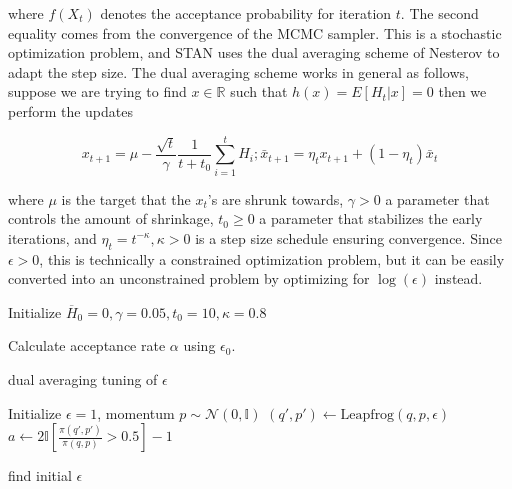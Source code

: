 \documentclass[]{report}
\begin{document}
where $f(X_t)$ denotes the acceptance probability for iteration $t$. The
second equality comes from the convergence of the MCMC sampler. This is a
stochastic optimization problem, and STAN uses the dual averaging scheme of
Nesterov  to adapt the step size. The dual averaging scheme works in general as
follows, suppose we are trying to find $x\in \mathbb{R}$ such that $h(x) =
E[H_t|x] = 0$ then we perform the updates 

\[x_{t+1}  = \mu - \frac{\sqrt{t}}{\gamma} \frac{1}{t+t_0} \sum_{i=1}^tH_i;
\bar{x}_{t+1} = \eta_t x_{t+1} + (1-\eta_t) \bar{x}_t \]

where $\mu$ is the target that the $x_t$'s are shrunk towards, $\gamma > 0$ a
parameter that controls the amount of shrinkage, $t_0 \ge 0$ a parameter that
stabilizes the early iterations, and $\eta_t = t^{-\kappa},\kappa>0$ is a
step size schedule ensuring convergence. Since $\epsilon>0$, this is technically
a constrained optimization problem, but it can be easily converted into an
unconstrained problem by optimizing for $\log(\epsilon)$ instead. 

\begin{algorithm}

Initialize $\overline{H}_0 = 0, \gamma = 0.05, t_0 = 10 ,\kappa = 0.8 $ \;
	
	Calculate acceptance rate $\alpha$ using $\epsilon_0$. \;

\caption{dual averaging tuning of $\epsilon$ }
\end{algorithm}


\begin{algorithm}
Initialize $\epsilon = 1$, momentum $p \sim \mathcal{N}(0,\mathbb{I}) $ \;
$(q',p') \leftarrow \text{Leapfrog}(q,p,\epsilon) $ \;
$a \leftarrow 2 \mathbb{I}[ \frac{\pi(q',p')}{\pi(q,p)} > 0.5 ] -1 $\;
\KwRet{$\epsilon$}
\caption{find initial $\epsilon$} 
\end{algorithm}
\end{document}
